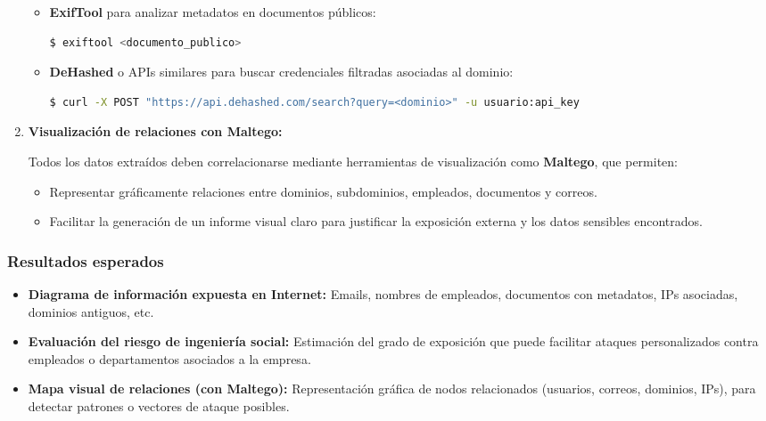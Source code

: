 \documentclass[a4paper, 11pt]{article}
\begin{document}
\begin{enumerate}
\begin{itemize}
        \item \textbf{ExifTool} para analizar metadatos en documentos públicos:
        \begin{lstlisting}[language=bash, style=terminalstyle, caption=Extracción de metadatos]
$ exiftool <documento_publico>
        \end{lstlisting}

        \item \textbf{DeHashed} o APIs similares para buscar credenciales filtradas asociadas al dominio:
        \begin{lstlisting}[language=bash, style=terminalstyle, caption=Búsqueda de filtraciones con DeHashed]
$ curl -X POST "https://api.dehashed.com/search?query=<dominio>" -u usuario:api_key
        \end{lstlisting}
    \end{itemize}

    \item \textbf{Visualización de relaciones con Maltego:}

    Todos los datos extraídos deben correlacionarse mediante herramientas de visualización como \textbf{Maltego}, que permiten:

    \begin{itemize}
        \item Representar gráficamente relaciones entre dominios, subdominios, empleados, documentos y correos.
        \item Facilitar la generación de un informe visual claro para justificar la exposición externa y los datos sensibles encontrados.
    \end{itemize}

\end{enumerate}


\subsubsection*{Resultados esperados}

\begin{itemize}
    \item \textbf{Diagrama de información expuesta en Internet:} Emails, nombres de empleados, documentos con metadatos, IPs asociadas, dominios antiguos, etc.
    \item \textbf{Evaluación del riesgo de ingeniería social:} Estimación del grado de exposición que puede facilitar ataques personalizados contra empleados o departamentos asociados a la empresa.
    \item \textbf{Mapa visual de relaciones (con Maltego):} Representación gráfica de nodos relacionados (usuarios, correos, dominios, IPs), para detectar patrones o vectores de ataque posibles.
\end{itemize}
\end{document}
